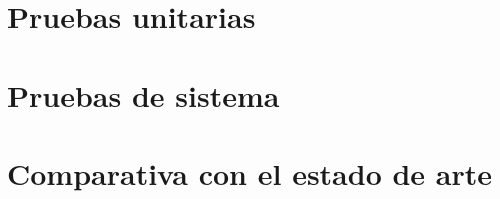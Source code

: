 %
%
%
%
%
%
%

\section{Pruebas unitarias}
\label{sec:Pruebas unitarias}


\section{Pruebas de sistema}
\label{sec:Pruebas de sistema}



\section{Comparativa con el estado de arte}
\label{sec:Comparativa con el estado de arte}